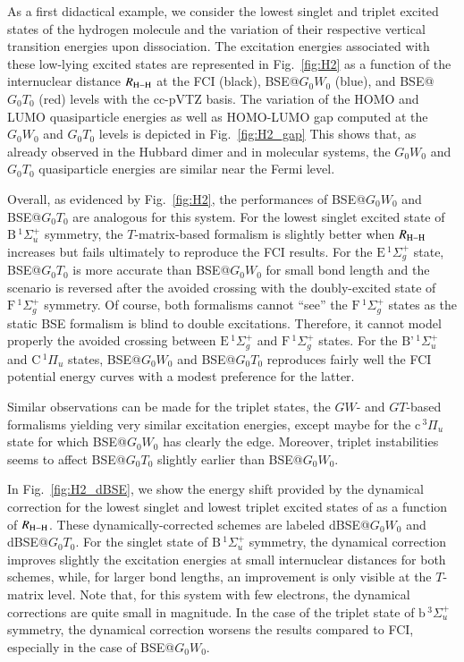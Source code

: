 \documentclass[aip,jcp,reprint,noshowkeys,superscriptaddress]{revtex4-1}
\begin{document}
As a first didactical example, we consider the lowest singlet and triplet excited states of the hydrogen molecule  and the variation of their respective vertical transition energies upon dissociation.
The excitation energies associated with these low-lying excited states are represented in Fig.~\ref{fig:H2} as a function of the internuclear distance $R_{\ce{H-H}}$ at the FCI (black), BSE@$G_0W_0$ (blue), and BSE@$G_0T_0$ (red) levels with the cc-pVTZ basis.
The variation of the HOMO and LUMO quasiparticle energies as well as HOMO-LUMO gap computed at the $G_0W_0$ and $G_0T_0$ levels is depicted in Fig.~\ref{fig:H2_gap}
This shows that, as already observed in the Hubbard dimer \cite{Romaniello_2012} and in molecular systems, \cite{Zhang_2017} the $G_0W_0$ and $G_0T_0$ quasiparticle energies are similar near the Fermi level.

Overall, as evidenced by Fig.~\ref{fig:H2}, the performances of BSE@$G_0W_0$ and BSE@$G_0T_0$ are analogous for this system.
For the lowest singlet excited state of $\text{B}\,{}^1\Sigma_u^+$ symmetry, the $T$-matrix-based formalism is slightly better when $R_{\ce{H-H}}$ increases but fails ultimately to reproduce the FCI results.
For the $\text{E}\,{}^1\Sigma_g^+$ state, BSE@$G_0T_0$ is more accurate than BSE@$G_0W_0$ for small bond length and the scenario is reversed after the avoided crossing with the doubly-excited state of $\text{F}\,{}^1\Sigma_g^+$ symmetry.
Of course, both formalisms cannot ``see'' the $\text{F}\,{}^1\Sigma_g^+$ states as the static BSE formalism is blind to double excitations.
Therefore, it cannot model properly the avoided crossing between $\text{E}\,{}^1\Sigma_g^+$ and $\text{F}\,{}^1\Sigma_g^+$ states.
For the $\text{B'}\,{}^1\Sigma_u^+$ and $\text{C}\,{}^1\Pi_u$ states, BSE@$G_0W_0$ and BSE@$G_0T_0$ reproduces fairly well the FCI potential energy curves with a modest preference for the latter.

Similar observations can be made for the triplet states, the $GW$- and $GT$-based formalisms yielding very similar excitation energies, except maybe for the $\text{c}\,{}^3\Pi_u$ state for which BSE@$G_0W_0$ has clearly the edge.
Moreover, triplet instabilities seems to affect BSE@$G_0T_0$ slightly earlier than BSE@$G_0W_0$.


In Fig.~\ref{fig:H2_dBSE}, we show the energy shift provided by the dynamical correction for the lowest singlet and lowest triplet excited states of  as a function of $R_{\ce{H-H}}$. 
These dynamically-corrected schemes are labeled dBSE@$G_0W_0$ and dBSE@$G_0T_0$.
For the singlet state of $\text{B}\,{}^1\Sigma_u^+$ symmetry, the dynamical correction improves slightly the excitation energies at small internuclear distances for both schemes, while, for larger bond lengths, an improvement is only visible at the $T$-matrix level.
Note that, for this system with few electrons, the dynamical corrections are quite small in magnitude.
In the case of the triplet state of $\text{b}\,{}^3\Sigma_u^+$ symmetry, the dynamical correction worsens the results compared to FCI, especially in the case of BSE@$G_0W_0$.
\end{document}
